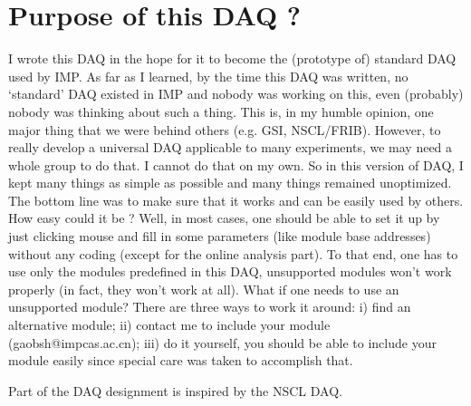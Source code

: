 \documentclass[a4paper,12pt]{article}
\begin{document}
	\section{Purpose of this DAQ ?}
	I wrote this DAQ in the hope for it to become the (prototype of)
	standard DAQ used by IMP. As far as I learned, by the time this DAQ was
	written, no `standard' DAQ existed in IMP and nobody was working on
	this, even (probably) nobody was thinking about such a thing. This is,
	in my humble opinion, one major thing that we were behind others (e.g.
	GSI, NSCL/FRIB). However, to really develop a universal DAQ applicable
	to many experiments, we may need a whole group to do that. I cannot do
	that on my own. So in this version of DAQ, I kept many things as simple
	as possible and many things remained unoptimized. The bottom line was to
	make sure that it works and can be easily used by others. How easy could
	it be ? Well, in most cases, one should be able to set it up by just
	clicking mouse and fill in some parameters (like module base addresses)
	without any coding (except for the online analysis part). To that end,
	one has to use only the modules predefined in this DAQ, unsupported
	modules won't work properly (in fact, they won't work at all). What if
	one needs to use an unsupported module? There are three ways to work it
	around: i) find an alternative module; ii) contact me to include your
	module (gaobsh@impcas.ac.cn); iii) do it yourself, you should be able to
	include your module easily since special care was taken to accomplish
	that.

	Part of the DAQ designment is inspired by the NSCL DAQ.
\end{document}
